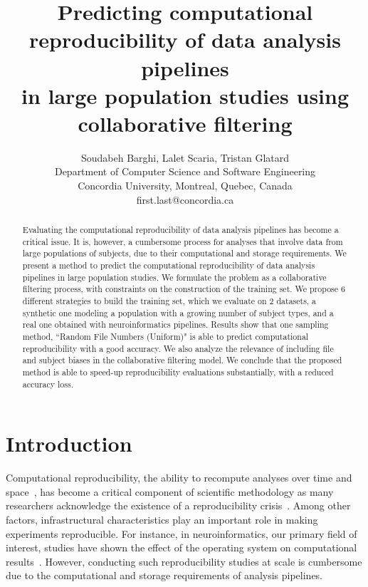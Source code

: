 \documentclass[10pt, conference, compsocconf]{IEEEtran}
\begin{document}
\title{Predicting computational reproducibility of data analysis pipelines \\in large population studies using collaborative filtering}

\author{Soudabeh Barghi, Lalet Scaria, Tristan Glatard\\
  Department of Computer Science and Software Engineering\\ Concordia University, Montreal, Quebec, Canada\\
  {first.last}@concordia.ca \vspace*{-0.5cm}}

\maketitle

\begin{abstract}
Evaluating the 
computational reproducibility of data analysis pipelines has become a 
critical issue. It is, however, a cumbersome 
process for analyses that involve data from large populations of 
subjects, due to their computational and storage requirements. 
We present a method to predict the computational 
reproducibility of data analysis pipelines in large population studies. 
We formulate the problem as a collaborative filtering process, with 
constraints on the construction of the training set. We propose 6 
different strategies to build the training set, which we evaluate on 2 
datasets, a synthetic one modeling a population with a growing number 
of subject types, and a real one obtained with neuroinformatics 
pipelines. Results show that one sampling method, ``Random File Numbers 
(Uniform)" is able to predict computational reproducibility with a good 
accuracy. We also analyze the relevance of including file and subject 
biases in the collaborative filtering model. We conclude that the 
proposed method is able to speed-up reproducibility 
evaluations substantially, with a reduced accuracy loss.
\end{abstract}

\section{Introduction}

Computational reproducibility, the ability to recompute analyses 
over time and 
space~\cite{peng2011reproducible}, has become a critical component of 
scientific methodology as many researchers acknowledge the existence of 
a reproducibility crisis~\cite{baker2016there}. Among other factors, infrastructural 
characteristics play an important role in making experiments 
reproducible. For 
instance, in 
neuroinformatics, our primary field of interest, studies have 
shown the effect of the 
operating system on computational 
results~\cite{gronenschild2012effects, glatard2015reproducibility}.
However, conducting such reproducibility studies at scale is cumbersome 
due to the computational and storage requirements of analysis 
pipelines.
\end{document}
